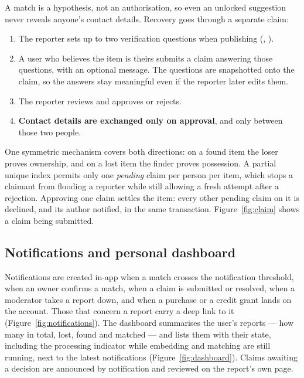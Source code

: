 A match is a hypothesis, not an authorisation, so even an unlocked suggestion
never reveals anyone's contact details. Recovery goes through a separate claim:

\begin{enumerate}[leftmargin=1.6em,itemsep=3pt]
  \item The reporter sets up to two verification questions when publishing
        (, ).
  \item A user who believes the item is theirs submits a claim answering those
        questions, with an optional message. The questions are snapshotted onto
        the claim, so the answers stay meaningful even if the reporter later
        edits them.
  \item The reporter reviews and approves or rejects.
  \item \textbf{Contact details are exchanged only on approval}, and only
        between those two people.
\end{enumerate}

One symmetric mechanism covers both directions: on a found item the loser proves
ownership, and on a lost item the finder proves possession. A partial unique
index permits only one \emph{pending} claim per person per item, which stops a
claimant from flooding a reporter while still allowing a fresh attempt after a
rejection. Approving one claim settles the item: every other pending claim on it
is declined, and its author notified, in the same transaction.
Figure~\ref{fig:claim} shows a claim being submitted.


\subsection{Notifications and personal dashboard}

Notifications are created in-app when a match crosses the notification
threshold, when an owner confirms a match, when a claim is submitted or
resolved, when a moderator takes a report down, and when a purchase or a credit
grant lands on the account. Those that concern a report carry a deep link to it
(Figure~\ref{fig:notifications}).
The dashboard summarises the user's reports --- how many in total, lost, found
and matched --- and lists them with their state, including the processing
indicator while embedding and matching are still running, next to the latest
notifications (Figure~\ref{fig:dashboard}). Claims awaiting a decision are
announced by notification and reviewed on the report's own page.

